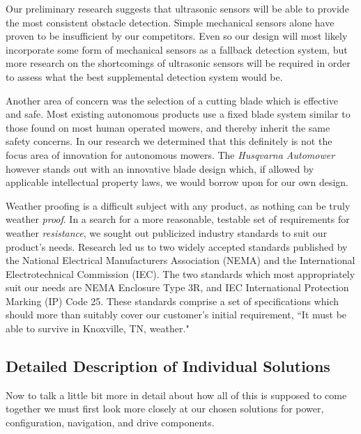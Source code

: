 \documentclass[12pt,letterpaper]{article}
\begin{document}
Our preliminary research suggests that ultrasonic sensors will be able to
provide the most consistent obstacle detection.  Simple mechanical sensors alone
have proven to be insufficient by our competitors. Even so our design will most
likely incorporate some form of mechanical sensors as a fallback detection
system, but more research on the shortcomings of ultrasonic sensors will be
required in order to assess what the best supplemental detection system would
be.

Another area of concern was the selection of a cutting blade which is effective
and safe.  Most existing autonomous products use a fixed blade system similar to
those found on most human operated mowers, and thereby inherit the same safety
concerns.  In our research we determined that this definitely is not the focus
area of innovation for autonomous mowers. The \textit{Husqvarna
Automower}\autocite{automower} however stands out with an innovative blade
design which, if allowed by applicable intellectual property laws, we would
borrow upon for our own design.

Weather proofing is a difficult subject with any product, as nothing can be
truly weather \textit{proof}.  In a search for a more reasonable, testable set
of requirements for weather \textit{resistance}, we sought out publicized
industry standards to suit our product's needs.  Research led us to two widely
accepted standards published by the National Electrical Manufacturers
Association (NEMA) and the International Electrotechnical Commission (IEC).  The
two standards which most appropriately suit our needs are NEMA Enclosure Type
3R\autocite{nema3r}, and IEC International Protection Marking (IP) Code
25.\autocite{ip25}  These standards comprise a set of specifications which
should more than suitably cover our customer's initial requirement, ``It must be
able to survive in Knoxville, TN, weather."

\subsection{Detailed Description of Individual Solutions}
Now to talk a little bit more in detail about how all of this is supposed to
come together we must first look more closely at our chosen solutions for power,
configuration, navigation, and drive components. 
\end{document}

